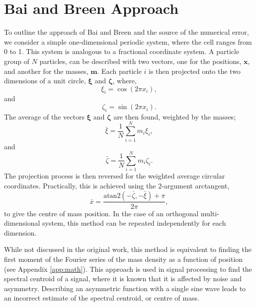 \documentclass[reprint,superscriptaddress,nobibnotes,amsmath,amssymb,aip]{revtex4-2}
\begin{document}
\section{Bai and Breen Approach}

To outline the approach of Bai and Breen and the source of the numerical error, we consider a simple one-dimensional periodic system, where the cell ranges from \num{0} to \num{1}. 
This system is analogous to a fractional coordinate system. 
A particle group of $N$ particles, can be described with two vectors, one for the positions, $\bm{x}$, and another for the masses, $\bm{m}$. 
Each particle $i$ is then projected onto the two dimensions of a unit circle, $\bm{\xi}$ and $\bm{\zeta}$, where, 
%
\begin{equation}
    \xi_i = \cos(2\pi x_i),
\end{equation}
%
and 
%
\begin{equation}
    \zeta_i = \sin(2\pi x_i).
\end{equation}
% 
The average of the vectors $\bm{\xi}$ and $\bm{\zeta}$ are then found, weighted by the masses;
%
\begin{equation}
    \bar{\xi} = \frac{1}{N}\sum_{i=1}^{N}m_i\xi_i,
\end{equation}
% 
and
%
\begin{equation}
    \bar{\zeta} = \frac{1}{N}\sum_{i=1}^{N}m_i\zeta_i.
\end{equation}
% 
The projection process is then reversed for the weighted average circular coordinates.
Practically, this is achieved using the 2-argument arctangent, 
%
\begin{equation}
    \bar{x} = \frac{\text{atan}2(-\bar{\zeta}, -\bar{\xi}) + \pi}{2\pi},
\end{equation}
%
to give the centre of mass position.
In the case of an orthogonal multi-dimensional system, this method can be repeated independently for each dimension. 

While not discussed in the original work, this method is equivalent to finding the first moment of the Fourier series of the mass density as a function of position (see Appendix \ref{app:math}). 
This approach is used in signal processing to find the spectral centroid of a signal\cite{tzanetakis_musical_2002}, where it is known that it is affected by noise and asymmetry\cite{teague_robust_2018}.
Describing an asymmetric function with a single sine wave leads to an incorrect estimate of the spectral centroid, or centre of mass. 
\end{document}
